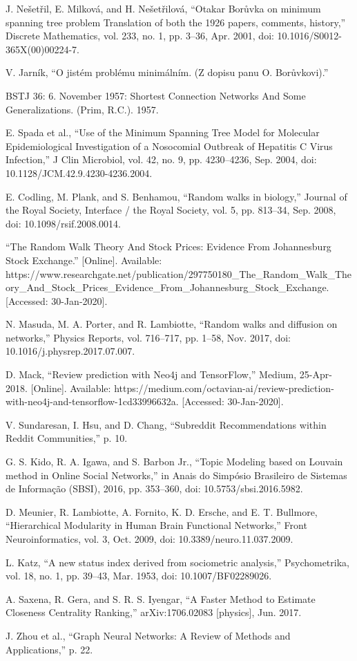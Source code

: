 \documentclass[journal,twoside,web]{ieeecolor}
\begin{document}
\begin{thebibliography}{9}
     J. Nešetřil, E. Milková, and H. Nešetřilová, “Otakar Borůvka on minimum spanning tree problem Translation of both the 1926 papers, comments, history,” Discrete Mathematics, vol. 233, no. 1, pp. 3–36, Apr. 2001, doi: 10.1016/S0012-365X(00)00224-7.

     V. Jarník, “O jistém problému minimálním. (Z dopisu panu O. Borůvkovi).”
    
     BSTJ 36: 6. November 1957: Shortest Connection Networks And Some Generalizations. (Prim, R.C.). 1957.

     E. Spada et al., “Use of the Minimum Spanning Tree Model for Molecular Epidemiological Investigation of a Nosocomial Outbreak of Hepatitis C Virus Infection,” J Clin Microbiol, vol. 42, no. 9, pp. 4230–4236, Sep. 2004, doi: 10.1128/JCM.42.9.4230-4236.2004.

     E. Codling, M. Plank, and S. Benhamou, “Random walks in biology,” Journal of the Royal Society, Interface / the Royal Society, vol. 5, pp. 813–34, Sep. 2008, doi: 10.1098/rsif.2008.0014.
    
     “The Random Walk Theory And Stock Prices: Evidence From Johannesburg Stock Exchange.” [Online]. Available: https://www.researchgate.net/publication/297750180{\_}The{\_}Random{\_}Walk{\_}Theory{\_}And{\_}Stock{\_}Prices{\_}Evidence{\_}From{\_}Johannesburg{\_}Stock{\_}Exchange. [Accessed: 30-Jan-2020].

     N. Masuda, M. A. Porter, and R. Lambiotte, “Random walks and diffusion on networks,” Physics Reports, vol. 716–717, pp. 1–58, Nov. 2017, doi: 10.1016/j.physrep.2017.07.007.
    
     D. Mack, “Review prediction with Neo4j and TensorFlow,” Medium, 25-Apr-2018. [Online]. Available: https://medium.com/octavian-ai/review-prediction-with-neo4j-and-tensorflow-1cd33996632a. [Accessed: 30-Jan-2020].
    
     V. Sundaresan, I. Hsu, and D. Chang, “Subreddit Recommendations within Reddit Communities,” p. 10.

     G. S. Kido, R. A. Igawa, and S. Barbon Jr., “Topic Modeling based on Louvain method in Online Social Networks,” in Anais do Simpósio Brasileiro de Sistemas de Informação (SBSI), 2016, pp. 353–360, doi: 10.5753/sbsi.2016.5982.
    
     D. Meunier, R. Lambiotte, A. Fornito, K. D. Ersche, and E. T. Bullmore, “Hierarchical Modularity in Human Brain Functional Networks,” Front Neuroinformatics, vol. 3, Oct. 2009, doi: 10.3389/neuro.11.037.2009.
    
     L. Katz, “A new status index derived from sociometric analysis,” Psychometrika, vol. 18, no. 1, pp. 39–43, Mar. 1953, doi: 10.1007/BF02289026.
    
     A. Saxena, R. Gera, and S. R. S. Iyengar, “A Faster Method to Estimate Closeness Centrality Ranking,” arXiv:1706.02083 [physics], Jun. 2017.
    
     J. Zhou et al., “Graph Neural Networks: A Review of Methods and Applications,” p. 22.

\end{thebibliography}
\end{document}
